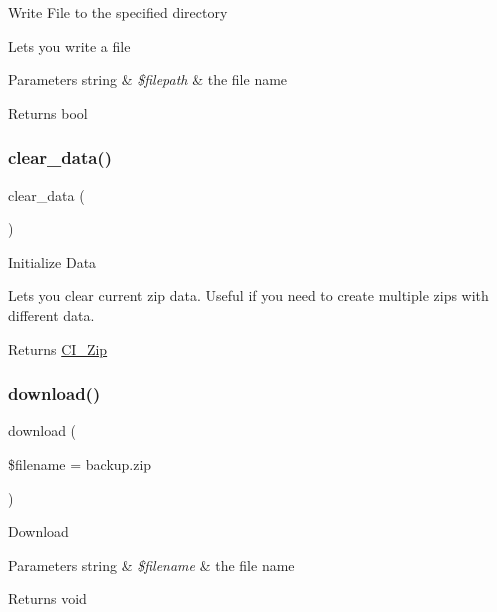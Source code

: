 Write File to the specified directory

Lets you write a file


\begin{DoxyParams}[1]{Parameters}
string & {\em \$filepath} & the file name \\
\hline
\end{DoxyParams}
\begin{DoxyReturn}{Returns}
bool 
\end{DoxyReturn}
\mbox{\label{class_c_i___zip_a89d046bac0ab06a81c5c03d55b4bcae5}} 
\subsubsection{\texorpdfstring{clear\+\_\+data()}{clear\_data()}}
{\footnotesize\ttfamily clear\+\_\+data (\begin{DoxyParamCaption}{ }\end{DoxyParamCaption})}

Initialize Data

Lets you clear current zip data. Useful if you need to create multiple zips with different data.

\begin{DoxyReturn}{Returns}
\mbox{\hyperlink{class_c_i___zip}{C\+I\+\_\+\+Zip}} 
\end{DoxyReturn}
\mbox{\label{class_c_i___zip_ad4263f6c296942842ae25a94053c5f16}} 
\subsubsection{\texorpdfstring{download()}{download()}}
{\footnotesize\ttfamily download (\begin{DoxyParamCaption}\item[{}]{\$filename = {\ttfamily \textquotesingle{}backup.zip\textquotesingle{}} }\end{DoxyParamCaption})}

Download


\begin{DoxyParams}[1]{Parameters}
string & {\em \$filename} & the file name \\
\hline
\end{DoxyParams}
\begin{DoxyReturn}{Returns}
void 
\end{DoxyReturn}
\mbox{\label{class_c_i___zip_a263fd906f99ccca15a12fe34a79656e4}} 
